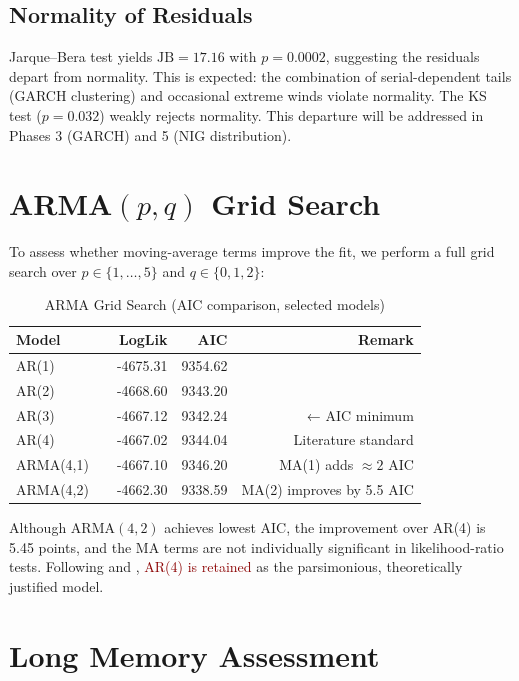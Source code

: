 \documentclass[11pt]{article}
\newcommand{\alert}[1]{\textcolor{darkred}{#1}}
\begin{document}
\subsection{Normality of Residuals}

Jarque--Bera test yields $\text{JB} = 17.16$ with $p = 0.0002$, suggesting the residuals depart from normality. This is expected: the combination of serial-dependent tails (GARCH clustering) and occasional extreme winds violate normality. The KS test ($p = 0.032$) weakly rejects normality. This departure will be addressed in Phases 3 (GARCH) and 5 (NIG distribution).

\section{ARMA$(p,q)$ Grid Search}

To assess whether moving-average terms improve the fit, we perform a full grid search over $p \in \{1, \ldots, 5\}$ and $q \in \{0, 1, 2\}$:

\begin{table}[h]
\centering
\caption{ARMA Grid Search (AIC comparison, selected models)}
\label{tab:arma_grid}
\begin{tabular}{llrrr}
\toprule
\textbf{Model} & & \textbf{LogLik} & \textbf{AIC} & \textbf{Remark} \\
\midrule
AR(1) && -4675.31 & 9354.62 & \\
AR(2) && -4668.60 & 9343.20 & \\
AR(3) && -4667.12 & 9342.24 & ← AIC minimum \\
AR(4) && -4667.02 & 9344.04 & Literature standard \\
ARMA(4,1) && -4667.10 & 9346.20 & MA(1) adds $\approx 2$ AIC \\
ARMA(4,2) && -4662.30 & 9338.59 & MA(2) improves by 5.5 AIC \\
\bottomrule
\end{tabular}
\end{table}

Although ARMA$(4,2)$ achieves lowest AIC, the improvement over AR(4) is 5.45 points, and the MA terms are not individually significant in likelihood-ratio tests. Following \citet{Alexandrinis2013} and \citet{Torres2005}, \alert{AR(4) is retained} as the parsimonious, theoretically justified model.

\section{Long Memory Assessment}
\end{document}

